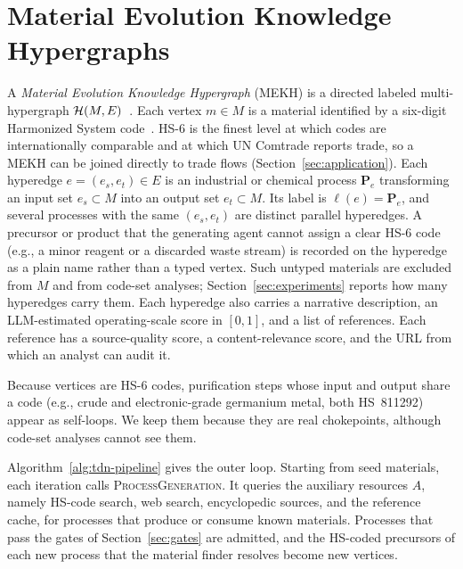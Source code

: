 \section{Material Evolution Knowledge Hypergraphs}
\label{sec:mekh}

A \emph{Material Evolution Knowledge Hypergraph} (MEKH) is a directed labeled multi-hypergraph $\mathcal{H}(M,E)$~\cite{ouvrardHypergraphsIntroductionReview2020}. Each vertex $m\in M$ is a material identified by a six-digit Harmonized System code~\cite{hscode}. HS-6 is the finest level at which codes are internationally comparable and at which UN Comtrade reports trade, so a MEKH can be joined directly to trade flows (Section~\ref{sec:application}). Each hyperedge $e=(e_s,e_t)\in E$ is an industrial or chemical process $\mathbf{P}_e$ transforming an input set $e_s\subset M$ into an output set $e_t\subset M$. Its label is $\ell(e)=\mathbf{P}_e$, and several processes with the same $(e_s,e_t)$ are distinct parallel hyperedges. A precursor or product that the generating agent cannot assign a clear HS-6 code (e.g., a minor reagent or a discarded waste stream) is recorded on the hyperedge as a plain name rather than a typed vertex. Such untyped materials are excluded from $M$ and from code-set analyses; Section~\ref{sec:experiments} reports how many hyperedges carry them. Each hyperedge also carries a narrative description, an LLM-estimated operating-scale score in $[0,1]$, and a list of references. Each reference has a source-quality score, a content-relevance score, and the URL from which an analyst can audit it.

Because vertices are HS-6 codes, purification steps whose input and output share a code (e.g., crude and electronic-grade germanium metal, both HS~811292) appear as self-loops. We keep them because they are real chokepoints, although code-set analyses cannot see them.

Algorithm~\ref{alg:tdn-pipeline} gives the outer loop. Starting from seed materials, each iteration calls \textsc{ProcessGeneration}. It queries the auxiliary resources $A$, namely HS-code search, web search, encyclopedic sources, and the reference cache, for processes that produce or consume known materials. Processes that pass the gates of Section~\ref{sec:gates} are admitted, and the HS-coded precursors of each new process that the material finder resolves become new vertices.

